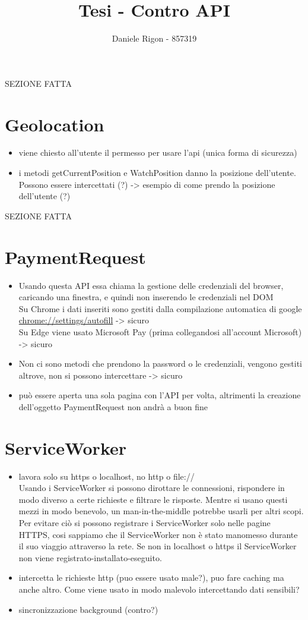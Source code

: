 \documentclass[italian]{article}
\author{
	Daniele Rigon - 857319 \\
}
\begin{document}
\title{Tesi - Contro API}
\maketitle

\tableofcontents
\pagebreak
SEZIONE FATTA
\section{Geolocation}
\begin{itemize}
\item viene chiesto all'utente il permesso per usare l'api (unica forma di sicurezza)
\item i metodi getCurrentPosition e WatchPosition danno la posizione dell'utente. Possono essere intercettati (?) -> esempio di come prendo la posizione dell'utente (?)
\end{itemize}

SEZIONE FATTA
\section{PaymentRequest}
\begin{itemize}
\item Usando questa API essa chiama la gestione delle credenziali del browser, caricando una finestra, e quindi non inserendo le credenziali nel DOM
\\
Su Chrome i dati inseriti sono gestiti dalla compilazione automatica di google \url{chrome://settings/autofill} -> sicuro
\\
Su Edge viene usato Microsoft Pay (prima collegandosi all'account Microsoft) -> sicuro 
\item Non ci sono metodi che prendono la password o le credenziali, vengono gestiti altrove, non si possono intercettare -> sicuro
\item può essere aperta una sola pagina con l'API per volta, altrimenti la creazione dell'oggetto PaymentRequest non andrà a buon fine 
\end{itemize}

\section{ServiceWorker}
\begin{itemize}
\item lavora solo su https o localhost, no http o file://
\\
Usando i ServiceWorker si possono dirottare le connessioni, rispondere in modo diverso a certe richieste e filtrare le risposte. Mentre  si usano questi mezzi in modo benevolo, un man-in-the-middle potrebbe usarli per altri scopi. Per evitare ciò si possono registrare i ServiceWorker solo nelle pagine HTTPS, cosi sappiamo che il ServiceWorker non è stato manomesso durante il suo viaggio attraverso la rete. Se non in localhost o https il ServiceWorker non viene registrato-installato-eseguito.
\item intercetta le richieste http (puo essere usato male?), puo fare caching ma anche altro. Come viene usato in modo malevolo intercettando dati sensibili?
\item sincronizzazione background (contro?)
\end{itemize}
\end{document}
